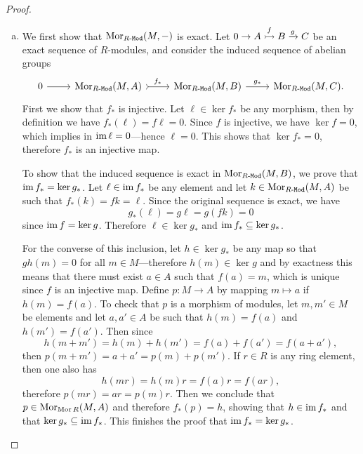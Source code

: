 \begin{proof}
\begin{enumerate}[(a)]\setlength\itemsep{0em}
\item We first show that \(\operatorname{Mor}_{{R\text{-}\texttt{Mod}}}(M, -)\) is exact. Let
  \(0 \to A \overset{f}{\rightarrowtail} B \xrightarrow g C\) be an exact sequence of
  \(R\)-modules, and consider the induced sequence of abelian groups
  \[
  \begin{tikzcd}
  0 \ar[r] &\Hom_{\Mod{R}}(M, A) \ar[r, tail, "f_{*}"] &\Hom_{\Mod{R}}(M, B)
  \ar[r, "g_{*}"] &\Hom_{\Mod{R}}(M, C).
  \end{tikzcd}
  \]
  First we show that \(f_{*}\) is injective. Let \(\ell \in \ker f_{*}\) be any
  morphism, then by definition we have \(f_{*}(\ell) = f \ell = 0\). Since \(f\)
  is injective, we have \(\ker f = 0\), which implies in
  \(\operatorname{im} \ell = 0\)---hence \(\ell = 0\). This shows that \(\ker f_{*} = 0\),
  therefore \(f_{*}\) is an injective map.

  To show that the induced sequence is exact in \(\operatorname{Mor}_{{R\text{-}\texttt{Mod}}}(M, B)\), we
  prove that \(\operatorname{im} f_{*} = \ker g_{*}\). Let \(\ell \in \operatorname{im} f_{*}\) be any
  element and let \(k \in \operatorname{Mor}_{{R\text{-}\texttt{Mod}}}(M, A)\) be such that
  \(f_{*}(k) = f k = \ell\). Since the original sequence is exact, we have
  \[
  g_{*}(\ell) = g \ell = g (f k) = 0
  \]
  since \(\operatorname{im} f = \ker g\). Therefore
  \(\ell \in \ker g_{*}\) and \(\operatorname{im} f_* \subseteq \ker g_{*}\).

  For the converse of this inclusion, let \(h \in \ker g_{*}\) be any map so
  that \(g h(m) = 0\) for all \(m \in M\)---therefore \(h(m) \in \ker g\) and by
  exactness this means that there must exist \(a \in A\) such that \(f(a) = m\),
  which is unique since \(f\) is an injective map. Define \(p: M \to A\) by
  mapping \(m \mapsto a\) if \(h(m) = f(a)\). To check that \(p\) is a morphism
  of modules, let \(m, m' \in M\) be elements and let \(a, a' \in A\) be such
  that \(h(m) = f(a)\) and \(h(m') = f(a')\). Then since
  \[
  h(m + m') = h(m) + h(m') = f(a) + f(a') = f(a + a'),
  \]
  then \(p(m + m') = a + a' = p(m) + p(m')\). If \(r \in R\) is any ring
  element, then one also has
  \[
  h(m r) = h(m) r = f(a) r = f(a r),
  \]
  therefore \(p(m r) = a r = p(m) r\). Then we conclude that \(p \in
  \operatorname{Mor}_{\operatorname{Mor}{R}}(M, A)\) and therefore \(f_{*}(p) = h\), showing that \(h \in
  \operatorname{im} f_{*}\) and that \(\ker g_{*} \subseteq \operatorname{im} f_{*}\). This finishes the
  proof that \(\operatorname{im} f_{*} = \ker g_{*}\).


\end{enumerate}
\end{proof}
